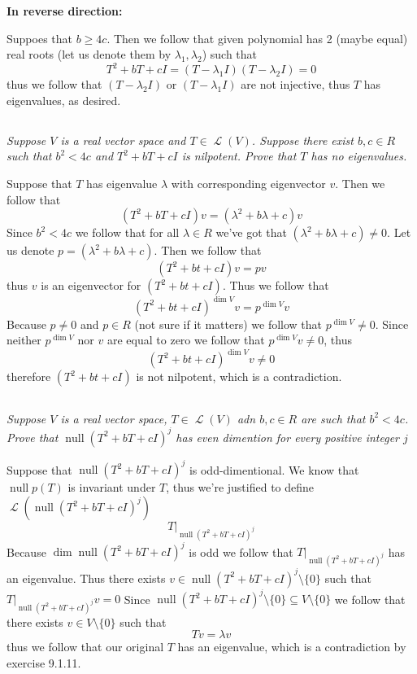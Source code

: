 \documentclass[11pt,oneside,titlepage]{book}
\DeclareMathOperator \map {\mathcal {L}}
\DeclareMathOperator \ns {null}
\begin{document}
\textbf{In reverse direction: }

Suppoes that $b \geq 4c$. Then we follow that given polynomial has 2 (maybe equal)
real roots (let us denote them by $\lambda_1, \lambda_2$) such that
$$T^2 + bT + cI = (T - \lambda_1I)(T - \lambda_2I) = 0$$
thus we follow that $(T - \lambda_2I)$ or $(T - \lambda_1I)$ are not injective, thus $T$
has eigenvalues, as desired.

\subsection{}

\textit{Suppose $V$ is a real vector space and $T \in \map(V)$. Suppose there exist $b, c \in R$
  such that $b^2 < 4c$ and $T^2 + bT + cI$ is nilpotent. Prove that $T$ has no eigenvalues.}

Suppose that $T$ has eigenvalue $\lambda$ with corresponding eigenvector $v$. Then we follow that
$$(T^2 + bT + cI)v = (\lambda^2 + b\lambda + c)v$$
Since $b^2 < 4c$ we follow that for all $\lambda \in R$ we've got that
$(\lambda^2 + b\lambda + c) \neq 0$. Let us denote $p = (\lambda^2 + b\lambda + c)$. Then we follow
that
$$(T^2 + bt + cI)v = pv$$
thus $v$ is an eigenvector for $(T^2 + bt + cI)$. Thus we follow that
$$(T^2 + bt + cI)^{\dim V}v = p^{\dim V}v$$
Because $p \neq 0$ and $p \in R$ (not sure if it matters) we follow that
$p^{\dim V} \neq 0$. Since neither $p^{\dim V}$ nor $v$ are equal to zero we follow that
$p^{\dim V} v  \neq 0$, thus
$$(T^2 + bt + cI)^{\dim V}v \neq 0$$
therefore $(T^2 + bt + cI)$ is not nilpotent, which is a contradiction.

\subsection{}

\textit{Suppose $V$ is a real vector space, $T \in \map(V)$ adn $b, c \in R$ are such that
  $b^2 < 4c$. Prove that $\ns(T^2 + bT + cI)^j$ has even dimention for every positive
  integer $j$}

Suppose that $\ns(T^2 + bT + cI)^j$ is odd-dimentional. We know that $\ns p(T)$ is invariant
under $T$, thus we're justified to define $\map(\ns(T^2 + bT + cI)^j)$
$$T|_{\ns(T^2 + bT + cI)^j}$$
Because $\dim \ns(T^2 + bT + cI)^j$ is odd we follow that $T|_{\ns(T^2 + bT + cI)^j}$ has an eigenvalue.
Thus there exists $v \in \ns(T^2 + bT + cI)^j\setminus \{0\}$ such that $T|_{\ns(T^2 + bT + cI)^j}v = 0$
Since $\ns(T^2 + bT + cI)^j\setminus \{0\} \subseteq V \setminus \{0\}$
we follow that there exists $v \in V \setminus \{0\}$
such that
$$Tv = \lambda v$$
thus we follow that our original $T$ has an eigenvalue, which is a contradiction by exercise 9.1.11.
\end{document}

